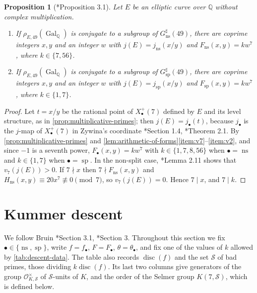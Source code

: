 \documentclass[12pt]{amsart}
\newcommand{\Q}{\mathbb{Q}}
\newcommand{\calS}{{\mathcal S}}
\newcommand{\OO}{{\mathcal O}}
\newcommand{\OKS}{\OO_{K,\calS}}
\DeclareMathOperator{\ns}{ns}
\DeclareMathOperator{\spc}{sp}
\DeclareMathOperator{\disc}{disc}
\DeclareMathOperator{\Gal}{Gal}
\newcommand{\cdef}[1]{{\color{blue} \textsf{#1}}} %
\numberwithin{equation}{section}
\newtheorem{proposition}[theorem]{Proposition}
\theoremstyle{definition}
\begin{document}
\begin{proposition}[\cite{Furio--Lombardo26}*{Proposition 3.1}]
  \label{prop:FL}
  Let $E$ be an elliptic curve over $\Q$ without complex multiplication.
  \begin{enumerate}
  \item If $\rho_{E,49}(\Gal_{\Q})$ is conjugate to a subgroup of
    $G_{\ns}^{\sharp}(49)$, there are coprime integers $x,y$ and an integer $w$
    with $j(E) = j_{\ns}(x/y)$ and $F_{\ns}(x,y) = kw^7$, where $k \in \{7,56\}$.
  \item If $\rho_{E,49}(\Gal_{\Q})$ is conjugate to a subgroup of
    $G_{\spc}^{\sharp}(49)$, there are coprime integers $x,y$ and an integer $w$
    with $j(E) = j_{\spc}(x/y)$ and $F_{\spc}(x,y) = kw^7$, where $k \in \{1,7\}$.
  \end{enumerate}
\end{proposition}
\begin{proof}
  Let $t = x/y$ be the rational point of $X_{\bullet}^{+}(7)$ defined by $E$ and
  its level structure, as in \cref{prop:multiplicative-primes}; then $j(E) =
  j_{\bullet}(t)$, because $j_{\bullet}$ is the $j$-map of $X_{\bullet}^{+}(7)$ in
  Zywina's coordinate \cite{Zywina-15}*{Section 1.4}, \cite{Furio--Lombardo26}*{Theorem 2.1}. By
  \cref{prop:multiplicative-primes} and
  \cref{lem:arithmetic-of-forms}\eqref{item:v7}--\eqref{item:v2}, and since $-1$
  is a seventh power, $F_{\bullet}(x,y) = kw^7$ with $k \in \{1,7,8,56\}$ when
  $\bullet = \ns$ and $k \in \{1,7\}$ when $\bullet = \spc$. In the non-split case,
  \cite{Furio--Lombardo26}*{Lemma 2.11} shows that $v_7(j(E)) > 0$. If $7 \nmid x$ then $7
  \nmid F_{\ns}(x,y)$ and $H_{\ns}(x,y) \equiv 20x^{7} \not\equiv 0 \pmod 7$, so
  $v_7(j(E)) = 0$. Hence $7 \mid x$, and $7 \mid k$.
\end{proof}

\section{Kummer descent}
\label{sec:descent}

We follow Bruin \cite{Bruin02-thesis}*{Section 3.1}, \cite{Bruin06-nn2}*{Section 3}. Throughout this
section we fix $\bullet \in \{\ns,\spc\}$, write $f = f_{\bullet}$,
$F = F_{\bullet}$, $\theta = \theta_{\bullet}$, and fix one of the values of
$k$ allowed by \cref{tab:descent-data}. The table also records $\disc(f)$ and
the set $\calS$ of \cdef{bad primes}, those dividing $k\disc(f)$. Its last
two columns give generators of the group $\OKS^{\times}$ of $\calS$-units of
$K$, and the order of the Selmer group $K(7,\calS)$, which is defined below.
\end{document}
